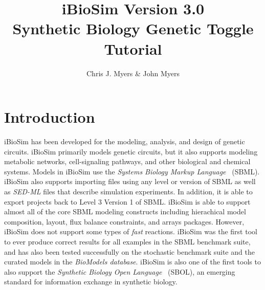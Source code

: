 \documentclass[titlepage,11pt]{article}
\title{iBioSim Version 3.0 \\ Synthetic Biology Genetic Toggle Tutorial}
\author{Chris J. Myers \& John Myers}
\begin{document}
\maketitle

  
\tableofcontents

\clearpage

\section{Introduction}

\noindent
iBioSim has been developed for the modeling, analysis, and design of genetic circuits. iBioSim primarily models genetic circuits, but it also supports modeling metabolic networks, cell-signaling pathways, and other biological and chemical systems. Models in iBioSim use the %
\emph{Systems Biology Markup Language}
~(SBML). iBioSim also supports importing files using any level or version of SBML as well as 
\emph{SED-ML} files 
that describe simulation experiments. In addition, it is able to export projects back to Level 3 Version 1 of SBML. iBioSim is able to support almost all of the core SBML modeling constructs including hierachical model composition, layout, flux balance constraints, and arrays packages. However, iBioSim does not support some types of \emph{fast} reactions. iBioSim was the first tool to ever produce correct results for all examples in the SBML benchmark suite, and has also been tested successfully on the stochastic benchmark suite and the curated models in the 
\emph{BioModels database}.
iBioSim is also one of the first tools to also support the 
\emph{Synthetic Biology Open Language}
~(SBOL), an emerging standard for information exchange in synthetic biology.
\end{document}
